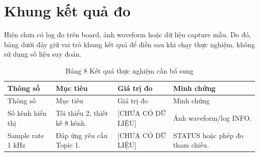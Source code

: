 \section{Khung kết quả đo}\label{khung-kux1ebft-quux1ea3-ux111o}

Hiện chưa có log đo trên board, ảnh waveform hoặc dữ liệu capture mẫu. Do đó, bảng dưới đây giữ vai trò khung kết quả để điền sau khi chạy thực nghiệm, không sử dụng số liệu suy đoán.

\begin{longtable}[]{@{}
  >{\raggedright\arraybackslash}p{}
  >{\raggedright\arraybackslash}p{}
  >{\raggedright\arraybackslash}p{}
  >{\raggedright\arraybackslash}p{}@{}}
\caption{Bảng 8 Kết quả thực nghiệm cần bổ sung}\tabularnewline
\toprule\noalign{}
\begin{minipage}[b]{\linewidth}\raggedright
Thông số
\end{minipage} & \begin{minipage}[b]{\linewidth}\raggedright
Mục tiêu
\end{minipage} & \begin{minipage}[b]{\linewidth}\raggedright
Giá trị đo
\end{minipage} & \begin{minipage}[b]{\linewidth}\raggedright
Minh chứng
\end{minipage} \\
\midrule\noalign{}
\endfirsthead
\toprule\noalign{}
\begin{minipage}[b]{\linewidth}\raggedright
Thông số
\end{minipage} & \begin{minipage}[b]{\linewidth}\raggedright
Mục tiêu
\end{minipage} & \begin{minipage}[b]{\linewidth}\raggedright
Giá trị đo
\end{minipage} & \begin{minipage}[b]{\linewidth}\raggedright
Minh chứng
\end{minipage} \\
\midrule\noalign{}
\endhead
\bottomrule\noalign{}
\endlastfoot
Số kênh hiển thị & Tối thiểu 2, thiết kế 8 kênh. & {[}CHƯA CÓ DỮ LIỆU{]} & Ảnh waveform/log INFO. \\
Sample rate 1 kHz & Đáp ứng yêu cầu Topic 1. & {[}CHƯA CÓ DỮ LIỆU{]} & STATUS hoặc phép đo tham chiếu. \\

\end{longtable}
